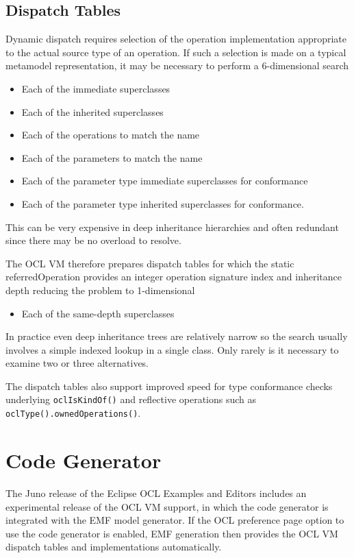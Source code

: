 \documentclass{sig-alternate}
\begin{document}
\subsection{Dispatch Tables}\label{DispatchTables}

Dynamic dispatch requires selection of the operation implementation appropriate to the actual source type of an operation. If such a selection is made on a typical metamodel representation, it may be necessary to perform a 6-dimensional search
\begin{itemize}
\item Each of the immediate superclasses 
\item Each of the inherited superclasses
\item Each of the operations to match the name
\item Each of the parameters to match the name
\item Each of the parameter type immediate superclasses for conformance
\item Each of the parameter type inherited superclasses for conformance.
\end{itemize}
This can be very expensive in deep inheritance hierarchies and often redundant since there may be no overload to resolve.

The OCL VM therefore prepares dispatch tables for which the static referredOperation provides an integer
operation signature index and inheritance depth reducing the problem to 1-dimensional 
\begin{itemize}
\item Each of the same-depth superclasses 
\end{itemize}

In practice even deep inheritance trees are relatively narrow so the search usually involves a simple indexed lookup in a single class. Only rarely is it necessary to examine two or three alternatives.

The dispatch tables also support improved speed for type conformance checks underlying \verb|oclIsKindOf()| and reflective operations such as \verb|oclType().ownedOperations()|.

\section{Code Generator}\label{VM future}

The Juno release of the Eclipse OCL Examples and Editors includes an experimental release of the OCL VM support,
in which the code generator is integrated with the EMF model generator. If the OCL preference page option to use the code generator is enabled, EMF generation then provides the OCL VM dispatch tables and implementations automatically.
\end{document}
